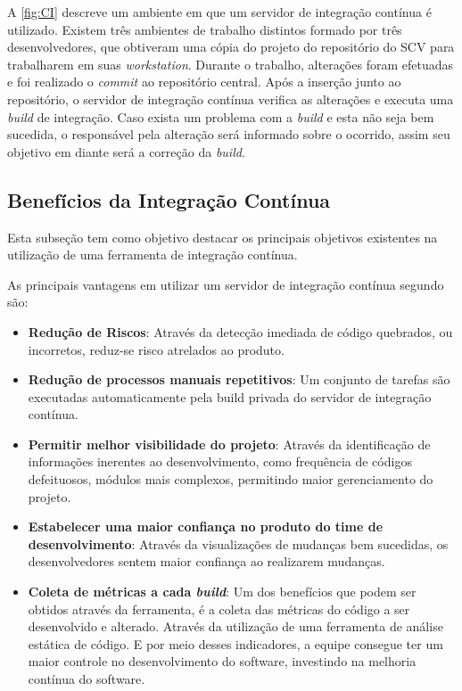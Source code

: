 A \autoref{fig:CI} descreve um ambiente em que um servidor de integração contínua é utilizado. Existem três ambientes de trabalho distintos formado por três desenvolvedores, que obtiveram uma cópia do projeto do repositório do SCV para trabalharem em suas \textit{workstation}. Durante o trabalho, alterações foram efetuadas e foi realizado o \textit{commit} ao repositório central. Após a inserção junto ao repositório, o servidor de integração contínua verifica as alterações e executa uma \textit{build} de integração. Caso exista um problema com a \textit{build} e esta não seja bem sucedida, o responsável pela alteração será informado sobre o ocorrido, assim seu objetivo em diante será a correção da \textit{build}.

\subsection{Benefícios da Integração Contínua}

Esta subseção tem como objetivo destacar os principais objetivos existentes na utilização de uma ferramenta de integração contínua.

As principais vantagens em utilizar um servidor de integração contínua segundo  são:

\begin{itemize}
\item {\textbf{Redução de Riscos}}: 
Através da detecção imediada de código quebrados, ou incorretos, reduz-se risco atrelados ao produto.
\item {\textbf{Redução de processos manuais repetitivos}}:
Um conjunto de tarefas são executadas automaticamente pela build privada do servidor de integração contínua.
\item {\textbf{Permitir melhor visibilidade do projeto}}:
Através da identificação de informações inerentes ao desenvolvimento, como frequência de códigos defeituosos, módulos mais complexos, permitindo maior gerenciamento do projeto.
\item {\textbf{Estabelecer uma maior confiança no produto do time de desenvolvimento}}:
Através da visualizações de mudanças bem sucedidas, os desenvolvedores sentem maior confiança ao realizarem mudanças.

\item\textbf{Coleta de métricas a cada \textit{build}}: Um dos benefícios que podem ser obtidos através da ferramenta, é a coleta das métricas do código a ser desenvolvido e alterado. Através da utilização de uma ferramenta de análise estática de código. E por meio desses indicadores, a equipe consegue ter um maior controle no desenvolvimento do software, investindo na melhoria contínua do software.
\end{itemize}

